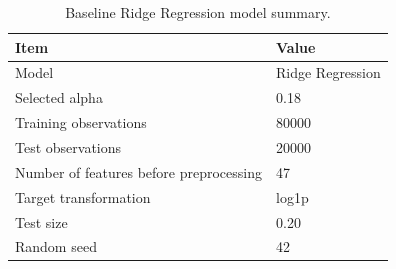 \begin{table}
\caption{Baseline Ridge Regression model summary.}
\label{tab:03-ridge-model-summary}
\begin{tabular}{ll}
\toprule
Item & Value \\
\midrule
Model & Ridge Regression \\
Selected alpha & 0.18 \\
Training observations & 80000 \\
Test observations & 20000 \\
Number of features before preprocessing & 47 \\
Target transformation & log1p \\
Test size & 0.20 \\
Random seed & 42 \\
\bottomrule
\end{tabular}
\end{table}
